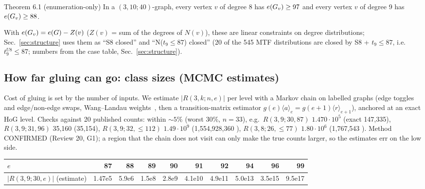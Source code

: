 \begin{namedthm}{Theorem 6.1 (enumeration-only)}
In a $(3,10;40)$-graph, every vertex $v$ of degree 8 has $e(G_{v}) \ge 97$ and
every vertex $v$ of degree 9 has $e(G_{v}) \ge 88$.
\end{namedthm}

With $e(G_{v}) = e(G) - Z(v)$ ($Z(v)$ = sum of the degrees of $N(v)$), these are linear constraints on degree
distributions; Sec.~\ref{sec:structure} uses them as ``S8 closed'' and ``N($t_9 \le 87$) closed'' (20 of the 545 MTF distributions
are closed by S8 + $t_9 \le 87$, i.e.\ $t_9^{U8} \le 87$; numbers from the case table, Sec.~\ref{sec:structure}).


\subsection{How far gluing can go: class sizes (MCMC estimates)}\label{sec:glue-mcmc}
Cost of gluing is set by the number of inputs. We estimate $|R(3,k;n,e)|$ per level with a Markov chain on
labelled graphs (edge toggles and edge/non-edge swaps, Wang--Landau weights~\cite{WL01}, then a transition-matrix
estimator $g(e)\langle a\rangle_e = g(e+1)\langle r\rangle_{e+1}$), anchored at an exact HoG level. Checks against 20 published counts:
within ${\sim}5\%$ (worst 30\%, $n = 33$), e.g.\ $R(3,9;30,87)$ $1.470\cdot 10^{5}$ (exact 147,335), $R(3,9;31,96)$ 35,160 (35,154),
$R(3,9;32,{\le}112)$ $1.49\cdot 10^{9}$ (1,554,928,360 \cite{Ang}), $R(3,8;26,{\le}77)$ $1.80\cdot 10^{6}$ (1,767,543 \cite{Ang}).
Method CONFIRMED (Review 20, G1); a region that the chain does not visit can only make the true
counts larger, so the estimates err on the low side.

\begin{center}\small
\begin{tabular}{@{}l*{9}{r}@{}}
\toprule
$e$ & 87 & 88 & 89 & 90 & 91 & 92 & 94 & 96 & 99 \\
\midrule
$|R(3,9;30,e)|$ (estimate) & 1.47e5 & 5.9e6 & 1.5e8 & 2.8e9 & 4.1e10 & 4.9e11 & 5.0e13 & 3.5e15 & 9.5e17 \\
\bottomrule
\end{tabular}
\end{center}

